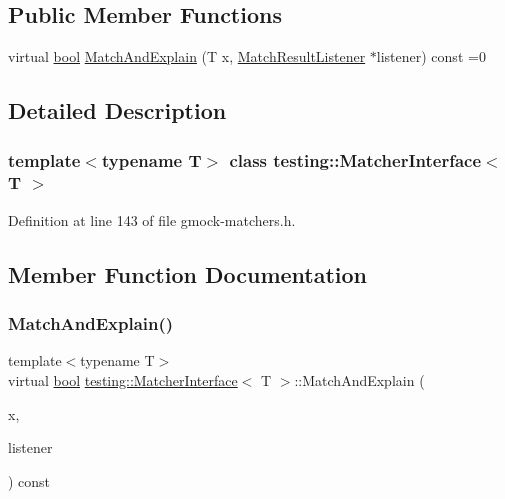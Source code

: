 \subsection*{Public Member Functions}
\begin{DoxyCompactItemize}
\item 
virtual \hyperlink{classbool}{bool} \hyperlink{classtesting_1_1MatcherInterface_a296b43607cd99d60365f0e6a762777cf}{Match\+And\+Explain} (T x, \hyperlink{classtesting_1_1MatchResultListener}{Match\+Result\+Listener} $\ast$listener) const =0
\end{DoxyCompactItemize}


\subsection{Detailed Description}
\subsubsection*{template$<$typename T$>$\newline
class testing\+::\+Matcher\+Interface$<$ T $>$}



Definition at line 143 of file gmock-\/matchers.\+h.



\subsection{Member Function Documentation}
\mbox{\label{classtesting_1_1MatcherInterface_a296b43607cd99d60365f0e6a762777cf}} 
\subsubsection{\texorpdfstring{Match\+And\+Explain()}{MatchAndExplain()}}
{\footnotesize\ttfamily template$<$typename T$>$ \\
virtual \hyperlink{classbool}{bool} \hyperlink{classtesting_1_1MatcherInterface}{testing\+::\+Matcher\+Interface}$<$ T $>$\+::Match\+And\+Explain (\begin{DoxyParamCaption}\item[{T}]{x,  }\item[{\hyperlink{classtesting_1_1MatchResultListener}{Match\+Result\+Listener} $\ast$}]{listener }\end{DoxyParamCaption}) const\hspace{0.3cm}{\ttfamily [pure virtual]}}



